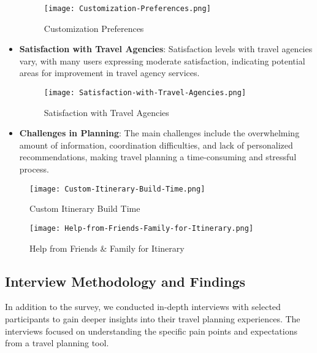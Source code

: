 \documentclass[conference]{IEEEtran}
\begin{document}
\begin{itemize}
            \begin{figure}
                \centering
                \texttt{[image: Customization-Preferences.png]}
                \caption{Customization Preferences}
                \label{fig:customization-preferences}
            \end{figure}
            \item \textbf{Satisfaction with Travel Agencies}: Satisfaction levels with travel agencies vary, with many users expressing moderate satisfaction, indicating potential areas for improvement in travel agency services.
            \begin{figure}
                \centering
                \texttt{[image: Satisfaction-with-Travel-Agencies.png]}
                \caption{Satisfaction with Travel Agencies}
                \label{fig:satisfaction-with-travel-agencies}
            \end{figure}
            \item \textbf{Challenges in Planning}: The main challenges include the overwhelming amount of information, coordination difficulties, and lack of personalized recommendations, making travel planning a time-consuming and stressful process.
        \end{itemize}
            \begin{figure}
                \centering
                \texttt{[image: Custom-Itinerary-Build-Time.png]}
                \caption{Custom Itinerary Build Time}
                \label{fig:custom-itinerary-build-time}
            \end{figure}
            \begin{figure}
                \centering
                \texttt{[image: Help-from-Friends-Family-for-Itinerary.png]}
                \caption{Help from Friends & Family for Itinerary}
                \label{fig:help-from-friends-family-for-itinerary}
            \end{figure}

    \subsection{Interview Methodology and Findings}
        In addition to the survey, we conducted in-depth interviews with selected participants to gain deeper insights into their travel planning experiences. The interviews focused on understanding the specific pain points and expectations from a travel planning tool.
\end{document}
